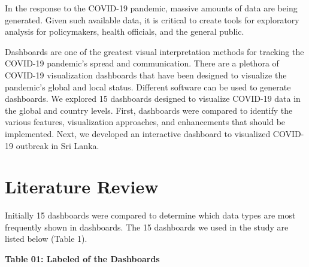 \documentclass[
]{article}
\begin{document}
In the response to the COVID-19 pandemic, massive amounts of data are
being generated. Given such available data, it is critical to create
tools for exploratory analysis for policymakers, health officials, and
the general public.

Dashboards are one of the greatest visual interpretation methods for
tracking the COVID-19 pandemic's spread and communication. There are a
plethora of COVID-19 visualization dashboards that have been designed to
visualize the pandemic's global and local status. Different software can
be used to generate dashboards. We explored 15 dashboards designed to
visualize COVID-19 data in the global and country levels. First,
dashboards were compared to identify the various features, visualization
approaches, and enhancements that should be implemented. Next, we
developed an interactive dashboard to visualized COVID-19 outbreak in
Sri Lanka.

\hypertarget{literature-review}{%
\section{Literature Review}\label{literature-review}}

Initially 15 dashboards were compared to determine which data types are
most frequently shown in dashboards. The 15 dashboards we used in the
study are listed below (Table 1).

\textbf{Table 01: Labeled of the Dashboards}
\end{document}
